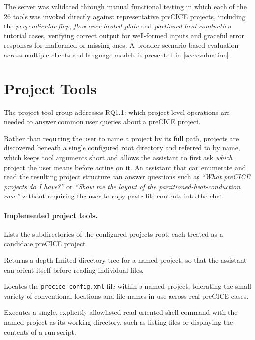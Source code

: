 \documentclass[
  numbers=noenddot,
  english,
  a4paper,
  twoside,
  bibliography=totoc,
  headsepline,
  cleardoublepage=empty,
  parskip=half,
  draft=false
]{scrbook}
\theoremstyle{break}
\renewcommand{\_}{\textunderscore\allowbreak}
\begin{document}
The server was validated through manual functional testing in which each of the 26 tools was
invoked directly against representative preCICE projects, including the
\emph{perpendicular-flap}, \emph{flow-over-heated-plate} and \emph{partioned-heat-conduction} tutorial cases, verifying correct
output for well-formed inputs and graceful error responses for malformed or missing ones.
A broader scenario-based evaluation across multiple clients and language models is presented
in \cref{sec:evaluation}.

\section{Project Tools}\label{sec:mcp-server:project-tools}

The project tool group addresses RQ1.1: which project-level operations are needed to answer
common user queries about a preCICE project.

Rather than requiring the user to name a project by its full path, projects are discovered
beneath a single configured root directory and referred to by name, which keeps tool arguments
short and allows the assistant to first ask \emph{which} project the user means before acting
on it.
An assistant that can enumerate and read the resulting project structure can answer questions
such as \emph{``What preCICE projects do I have?''} or \emph{``Show me the layout of the
partitioned-heat-conduction case''} without requiring the user to copy-paste file contents into
the chat.

\paragraph{Implemented project tools.}

\begin{description}[font=\ttfamily]
  \item[list\_precice\_projects] Lists the subdirectories of the configured projects root,
        each treated as a candidate preCICE project.
  \item[inspect\_project\_structure] Returns a depth-limited directory tree for a named
        project, so that the assistant can orient itself before reading individual files.
  \item[find\_precice\_config] Locates the \texttt{precice-config.xml} file within a named
        project, tolerating the small variety of conventional locations and file names in use
        across real preCICE cases.
  \item[run\_command\_in\_project] Executes a single, explicitly allowlisted read-oriented
        shell command with the named project as its working directory, such as listing files
        or displaying the contents of a run script.
\end{description}
\end{document}
